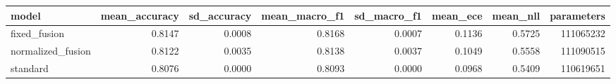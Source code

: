 \begin{tabular}{lrrrrrrr}
\toprule
model & mean_accuracy & sd_accuracy & mean_macro_f1 & sd_macro_f1 & mean_ece & mean_nll & parameters \\
\midrule
fixed_fusion & 0.8147 & 0.0008 & 0.8168 & 0.0007 & 0.1136 & 0.5725 & 111065232 \\
normalized_fusion & 0.8122 & 0.0035 & 0.8138 & 0.0037 & 0.1049 & 0.5558 & 111090515 \\
standard & 0.8076 & 0.0000 & 0.8093 & 0.0000 & 0.0968 & 0.5409 & 110619651 \\
\bottomrule
\end{tabular}
